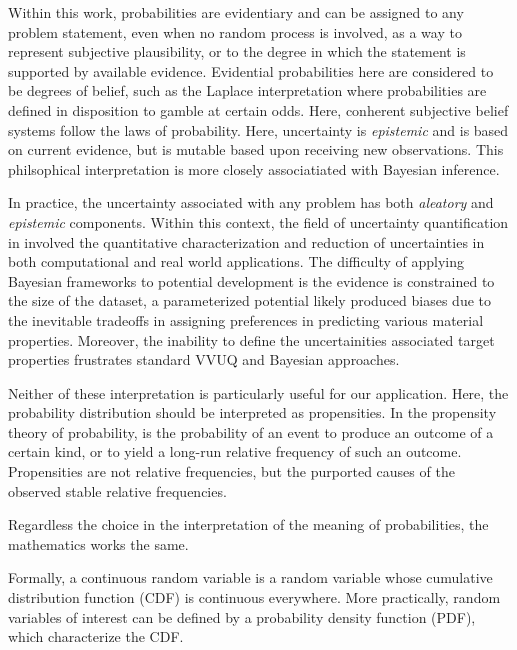 Within this work, probabilities are evidentiary and can be assigned to any problem statement, even when no random process is involved, as a way to represent subjective plausibility, or to the degree in which the statement is supported by available evidence.  Evidential probabilities here are considered to be degrees of belief, such as the Laplace interpretation where probabilities are defined in disposition to gamble at certain odds\cite{laplace_probability}.  Here, conherent subjective belief systems follow the laws of probability\cite{ramsey_probability,definetti_probability}.  Here, uncertainty is \emph{epistemic} and is based on current evidence, but is mutable based upon receiving new observations\cite{ramsey2016truth,definetti1980_foresight,jaynes2003_probability}.  This philsophical interpretation is more closely associatiated with Bayesian inference.

In practice, the uncertainty associated with any problem has both \emph{aleatory} and \emph{epistemic} components.  Within this context, the field of uncertainty quantification\cite{oberkamph} in involved the quantitative characterization and reduction of uncertainties in both computational and real world applications.  The difficulty of applying Bayesian frameworks to potential development is the evidence is constrained to the size of the dataset, a parameterized potential likely produced biases due to the inevitable tradeoffs in assigning preferences in predicting various material properties.  Moreover, the inability to define the uncertainities associated target properties frustrates standard VVUQ and Bayesian approaches.

 Neither of these interpretation is particularly useful for our application.  Here, the probability distribution should be interpreted as propensities.  In the propensity theory of probability, is the probability of an event to produce an outcome of a certain kind, or to yield a long-run relative frequency of such an outcome.  Propensities are not relative frequencies, but the purported causes of the observed stable relative frequencies.

Regardless the choice in the interpretation of the meaning of probabilities, the mathematics works the same.

Formally, a continuous random variable is a random variable whose cumulative distribution function (CDF) is continuous everywhere\cite{bertsekas2002_probabilitytheory}.  More practically, random variables of interest can be defined by a probability density function (PDF), which characterize the CDF.

